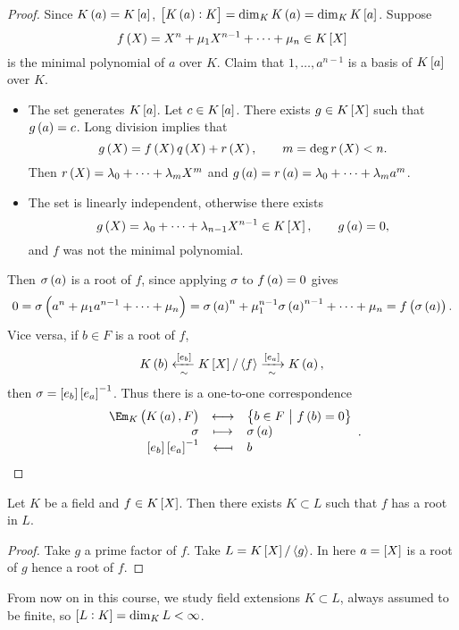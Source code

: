 \pagebreak

\begin{proof}
Since $ K\br{a} = K\sbr{a} $, $ \sbr{K\br{a} : K} = \dim_K K\br{a} = \dim_K K\sbr{a} $. Suppose
$$ f\br{X} = X^n + \mu_1X^{n - 1} + \dots + \mu_n \in K\sbr{X} $$
is the minimal polynomial of $ a $ over $ K $. Claim that $ 1, \dots, a^{n - 1} $ is a basis of $ K\sbr{a} $ over $ K $.
\begin{itemize}
\item The set generates $ K\sbr{a} $. Let $ c \in K\sbr{a} $. There exists $ g \in K\sbr{X} $ such that $ g\br{a} = c $. Long division implies that
$$ g\br{X} = f\br{X}q\br{X} + r\br{X}, \qquad m = \deg r\br{X} < n. $$
Then $ r\br{X} = \lambda_0 + \dots + \lambda_mX^m $ and $ g\br{a} = r\br{a} = \lambda_0 + \dots + \lambda_ma^m $.
\item The set is linearly independent, otherwise there exists
$$ g\br{X} = \lambda_0 + \dots + \lambda_{n - 1}X^{n- 1} \in K\sbr{X}, \qquad g\br{a} = 0, $$
and $ f $ was not the minimal polynomial.
\end{itemize}
Then $ \sigma\br{a} $ is a root of $ f $, since applying $ \sigma $ to $ f\br{a} = 0 $ gives
$$ 0 = \sigma\br{a^n + \mu_1a^{n - 1} + \dots + \mu_n} = \sigma\br{a}^n + \mu_1^{n - 1}\sigma\br{a}^{n - 1} + \dots + \mu_n = f\br{\sigma\br{a}}. $$
Vice versa, if $ b \in F $ is a root of $ f $,
$$ K\br{b} \xleftarrow[\sim]{\sbr{e_b}} K\sbr{X} / \abr{f} \xrightarrow[\sim]{\sbr{e_a}} K\br{a}, $$
then $ \sigma = \sbr{e_b}\sbr{e_a}^{-1} $. Thus there is a one-to-one correspondence
$$ \bijection{\Em_K\br{K\br{a}, F}}{\cbr{b \in F \st f\br{b} = 0}}{\sigma}{\sigma\br{a}}{\sbr{e_b}\sbr{e_a}^{-1}}{b}. $$
\end{proof}

\begin{corollary}
Let $ K $ be a field and $ f \in K\sbr{X} $. Then there exists $ K \subset L $ such that $ f $ has a root in $ L $.
\end{corollary}

\begin{proof}
Take $ g $ a prime factor of $ f $. Take $ L = K\sbr{X} / \abr{g} $. In here $ a = \sbr{X} $ is a root of $ g $ hence a root of $ f $.
\end{proof}


From now on in this course, we study field extensions $ K \subset L $, always assumed to be finite, so $ \sbr{L : K} = \dim_K L < \infty $.

